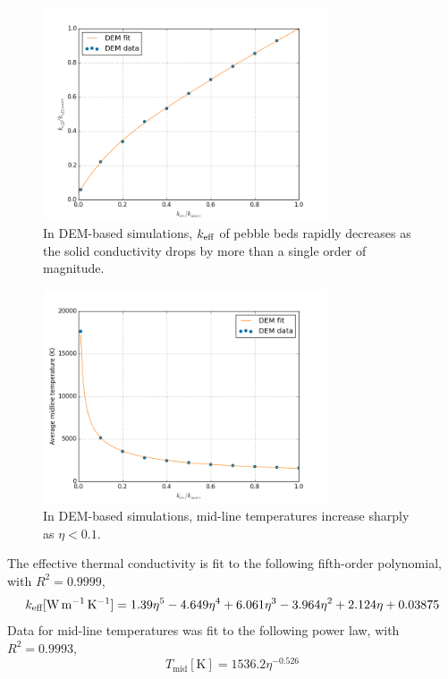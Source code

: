 \begin{figure}[ht]
    \centering
    \includegraphics[width = 0.75\textwidth]{figures/irradiated/keff-plots.png}
    \caption{In DEM-based simulations, $k_\text{eff}$ of pebble beds rapidly decreases as the solid conductivity drops by more than a single order of magnitude.}\label{fig:irrad-keff}
\end{figure}

\begin{figure}[ht]
    \centering
    \includegraphics[width = 0.75\textwidth]{figures/irradiated/Tmid-plots.png}
    \caption{In DEM-based simulations, mid-line temperatures increase sharply as $\eta < 0.1$.}\label{fig:irrad-mids}
\end{figure}

The effective thermal conductivity is fit to the following fifth-order polynomial, with $R^2 = 0.9999$,
\begin{equation}
k_\text{eff} [\si{\watt\per\meter\per\kelvin}] = 1.39 \eta^5 - 4.649 \eta^4 + 6.061 \eta^3 - 3.964 \eta^2 + 2.124 \eta + 0.03875
\end{equation}
Data for mid-line temperatures was fit to the following power law, with $R^2 = 0.9993$,
\begin{equation}
T_\text{mid}[\si{\kelvin}] = 1536.2\eta^{-0.526}
\end{equation}

